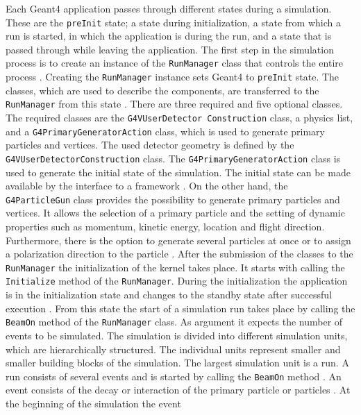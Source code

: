 \documentclass[12pt, a4paper]{thesis}
\begin{document}
Each Geant4 application passes through different states during a
simulation. These are the \texttt{preInit} state; a state during
initialization, a state from which a run is started, in which the
application is during the run, and a state that is passed through
while leaving the application. The first step in the simulation
process is to create an instance of the \texttt{RunManager} class that
controls the entire process \cite{geant4-doc} . Creating the
\texttt{RunManager} instance sets Geant4 to \texttt{preInit}
state. The classes, which are used to describe the components, are
transferred to the \texttt{RunManager} from this state
\cite{geant4-doc} . There are three required and five optional
classes. The required classes are the
\texttt{G4VUserDetector Construction} class, a physics list, and a
\texttt{G4PrimaryGeneratorAction} class, which is used to generate
primary particles and vertices. The used detector geometry is defined
by the \texttt{G4VUserDetectorConstruction} class. The
\texttt{G4PrimaryGeneratorAction} class is used to generate the
initial state of the simulation. The initial state can be made
available by the interface to a framework \cite{geant_simul_toolk}
. On the other hand, the \texttt{G4ParticleGun} class provides the
possibility to generate primary particles and vertices. It allows the
selection of a primary particle and the setting of dynamic properties
such as momentum, kinetic energy, location and flight
direction. Furthermore, there is the option to generate several
particles at once or to assign a polarization direction to the
particle \cite{geant4-doc}. After the submission of the classes to the
\texttt{RunManager} the initialization of the kernel takes place. It
starts with calling the \texttt{Initialize} method of the
\texttt{RunManager}. During the initialization the application is in
the initialization state and changes to the standby state after
successful execution \cite{geant4-doc}. From this state the start of a
simulation run takes place by calling the \texttt{BeamOn} method of
the \texttt{RunManager} class. As argument it expects the number of
events to be simulated.  The simulation is divided into different
simulation units, which are hierarchically structured. The individual
units represent smaller and smaller building blocks of the simulation.
The largest simulation unit is a run. A run consists of several events
and is started by calling the \texttt{BeamOn} method
\cite{geant4-doc,geant4-rec-dev}. An event consists of the decay or
interaction of the primary particle or particles
\cite{geant4-rec-dev}. At the beginning of the simulation the event
\end{document}
